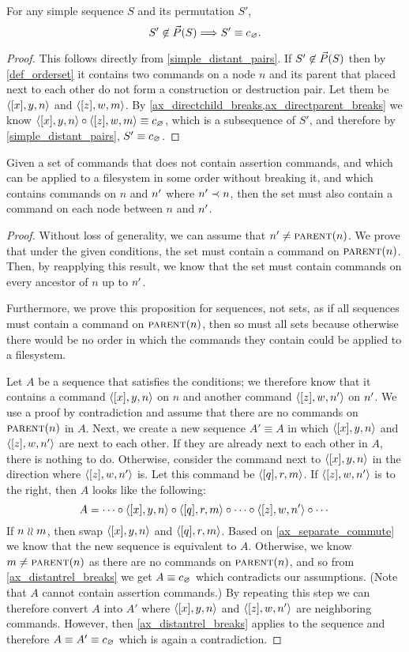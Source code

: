 \begin{mycor}
For any simple sequence $S$ and its permutation $S'$, 
\[ S'\not\in\vec{P}({S}) \Longrightarrow S'\equiv c_\varnothing. \]
\end{mycor}
\begin{proof}
This follows directly from \cref{simple_distant_pairs}.
If $S'\not\in\vec{P}({S})$ then by \cref{def_orderset}
it contains two commands on a node $n$ and its parent
that placed next to each other do not form
a construction or destruction pair.
Let them be $\langle{[x],y,n}\rangle$ and $\langle{[z],w,m}\rangle$.
By \cref{ax_directchild_breaks,ax_directparent_breaks}
we know
$\langle{[x],y,n}\rangle\circ\langle{[z],w,m}\rangle\equiv c_\varnothing$, which is a subsequence of $S'$,
and therefore by \cref{simple_distant_pairs}, $S'\equiv c_\varnothing$.
\end{proof}



\begin{mylem}
Given a set of commands that
does not contain assertion commands,
and which can be applied to a filesystem in some order without breaking it,
and which contains commands on $n$ and $n'$ where $n'\prec n$,
then the set must also contain a command
on each node between $n$ and $n'$.
\end{mylem}
\begin{proof}
Without loss of generality, we can assume that $n'\neq\text{\normalfont\scshape{parent}}(n)$.
We prove that under the given conditions, the set must contain a command on $\text{\normalfont\scshape{parent}}(n)$.
Then, by reapplying this result, we know that the set must contain commands on every
ancestor of $n$ up to $n'$.

Furthermore,
we prove this proposition for sequences, not sets, as if all sequences must contain a command on $\text{\normalfont\scshape{parent}}(n)$,
then so must all sets because otherwise there would be no order in which the commands they contain could be
applied to a filesystem.

Let $A$ be a sequence that satisfies the conditions;
we therefore know that it contains a command $\langle{[x],y,n}\rangle$ on $n$
and another command $\langle{[z],w,n'}\rangle$ on $n'$.
We use a proof by contradiction and assume that there are no commands on $\text{\normalfont\scshape{parent}}(n)$ in $A$.
Next, we create a new sequence $A'\equiv A$ in which $\langle{[x],y,n}\rangle$ and $\langle{[z],w,n'}\rangle$ are next to each other.
If they are already next to each other in $A$, there is nothing to do.
Otherwise, consider the command next to $\langle{[x],y,n}\rangle$ in the direction where $\langle{[z],w,n'}\rangle$ is.
Let this command be $\langle{[q],r,m}\rangle$.
If $\langle{[z],w,n'}\rangle$ is to the right, then $A$ looks like the following:
\[ A = \cdots\circ\langle{[x],y,n}\rangle\circ\langle{[q],r,m}\rangle\circ\cdots\circ\langle{[z],w,n'}\rangle\circ\cdots \]
If $n\mathrel{\wr\wr} m$, then swap $\langle{[x],y,n}\rangle$ and $\langle{[q],r,m}\rangle$. Based on \cref{ax_separate_commute} we know that the new
sequence is equivalent to $A$.
Otherwise, we know $m\neq\text{\normalfont\scshape{parent}}(n)$ as there are no commands on $\text{\normalfont\scshape{parent}}(n)$, and so
from \cref{ax_distantrel_breaks} we get $A\equiv c_\varnothing$ which contradicts our assumptions.
(Note that $A$ cannot contain assertion commands.)
By repeating this step we can therefore convert $A$ into $A'$ where $\langle{[x],y,n}\rangle$ and $\langle{[z],w,n'}\rangle$ are neighboring commands.
However, then \cref{ax_distantrel_breaks} applies to the sequence and therefore $A\equiv A'\equiv c_\varnothing$ which
is again a contradiction.
\end{proof}

